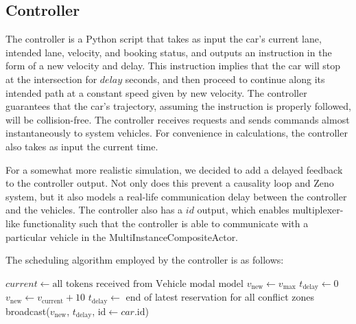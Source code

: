 \subsection{Controller}

The controller is a Python script that takes as input the car's current
lane, intended lane, velocity, and booking status, and outputs an
instruction in the form of a new velocity and delay. This instruction
implies that the car will stop at the intersection for $delay$ seconds, and
then proceed to continue along its intended path at a constant speed given
by new velocity. The controller guarantees that the car's trajectory,
assuming the instruction is properly followed, will be collision-free. The
controller receives requests and sends commands almost instantaneously to
system vehicles. For convenience in calculations, the controller also takes
as input the current time.

For a somewhat more realistic simulation, we decided to add a delayed
feedback to the controller output. Not only does this prevent a causality
loop and Zeno system, but it also models a real-life communication delay
between the controller and the vehicles. The controller also has a $id$
output, which enables multiplexer-like functionality such that the
controller is able to communicate with a particular vehicle in the
MultiInstanceCompositeActor.

The scheduling algorithm employed by the controller is as follows:

\begin{framed}
\centering\small
\begin{algorithmic}
	\State $current \gets \text{all tokens received from Vehicle modal model}$
				\State $v_\text{new} \gets v_\text{max}$
				\State $t_\text{delay} \gets 0$
			\Else
				\State $v_\text{new} \gets v_\text{current} + 10$
				\State $t_\text{delay} \gets$ end of latest reservation for all conflict zones
			\EndIf
			\State broadcast($v_\text{new}$, $t_\text{delay}$,
					$\text{id} \gets car\text{.id}$)
		\EndIf
	\EndFor
\EndFor
\end{algorithmic}
\end{framed}
